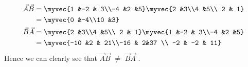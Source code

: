 \begin{align}
    \vec{A}\vec{B}&=\myvec{1 &-2 & 3\\-4 &2 &5}\myvec{2 &3\\4 &5\\ 2 & 1}
    \\
&=\myvec{0 &-4\\10 &3} \\
    \vec{B}\vec{A} &=\myvec{2 &3\\4 &5\\ 2 & 1}\myvec{1 &-2 & 3\\-4 &2 &5} \\
&=\myvec{-10 &2 & 21\\-16 & 2&37 \\ -2 & -2 & 11}
\end{align}
Hence we can clearly see that $\vec{A}\vec{B}$ $\neq$ $\vec{B}\vec{A}$ .